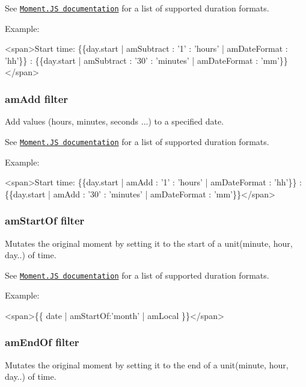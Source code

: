 See \href{http://momentjs.com/docs/#/durations/creating/}{\tt Moment.\+JS documentation} for a list of supported duration formats.

Example\+:


\begin{DoxyCode}
<span>Start time: \{\{day.start | amSubtract : '1' : 'hours' | amDateFormat : 'hh'\}\} : \{\{day.start |
       amSubtract : '30' : 'minutes' | amDateFormat : 'mm'\}\}</span>
\end{DoxyCode}


\subsubsection*{am\+Add filter}

Add values (hours, minutes, seconds ...) to a specified date.

See \href{http://momentjs.com/docs/#/durations/creating/}{\tt Moment.\+JS documentation} for a list of supported duration formats.

Example\+:


\begin{DoxyCode}
<span>Start time: \{\{day.start | amAdd : '1' : 'hours' | amDateFormat : 'hh'\}\} : \{\{day.start | amAdd : '30'
       : 'minutes' | amDateFormat : 'mm'\}\}</span>
\end{DoxyCode}


\subsubsection*{am\+Start\+Of filter}

Mutates the original moment by setting it to the start of a unit(minute, hour, day..) of time.

See \href{http://momentjs.com/docs/#/manipulating/start-of/}{\tt Moment.\+JS documentation} for a list of supported duration formats.

Example\+:


\begin{DoxyCode}
<span>\{\{ date | amStartOf:'month' | amLocal \}\}</span>
\end{DoxyCode}


\subsubsection*{am\+End\+Of filter}

Mutates the original moment by setting it to the end of a unit(minute, hour, day..) of time.

